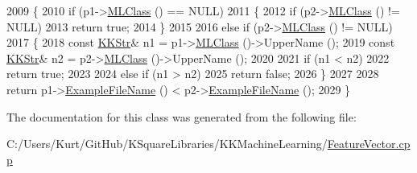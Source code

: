 \begin{DoxyCode}
2009   \{
2010     \textcolor{keywordflow}{if}  (p1->\hyperlink{class_k_k_m_l_l_1_1_feature_vector_a3c8fe002c6e868f8c00059c004fb32fd}{MLClass} () == NULL)
2011     \{
2012       \textcolor{keywordflow}{if}  (p2->\hyperlink{class_k_k_m_l_l_1_1_feature_vector_a3c8fe002c6e868f8c00059c004fb32fd}{MLClass} () != NULL)
2013         \textcolor{keywordflow}{return}  \textcolor{keyword}{true};
2014     \}
2015 
2016     \textcolor{keywordflow}{else} \textcolor{keywordflow}{if}  (p2->\hyperlink{class_k_k_m_l_l_1_1_feature_vector_a3c8fe002c6e868f8c00059c004fb32fd}{MLClass} () != NULL)
2017     \{
2018       \textcolor{keyword}{const} \hyperlink{class_k_k_b_1_1_k_k_str}{KKStr}& n1 = p1->\hyperlink{class_k_k_m_l_l_1_1_feature_vector_a3c8fe002c6e868f8c00059c004fb32fd}{MLClass} ()->UpperName ();
2019       \textcolor{keyword}{const} \hyperlink{class_k_k_b_1_1_k_k_str}{KKStr}& n2 = p2->\hyperlink{class_k_k_m_l_l_1_1_feature_vector_a3c8fe002c6e868f8c00059c004fb32fd}{MLClass} ()->UpperName ();
2020 
2021       \textcolor{keywordflow}{if}  (n1 < n2)
2022         \textcolor{keywordflow}{return} \textcolor{keyword}{true};
2023 
2024       \textcolor{keywordflow}{else} \textcolor{keywordflow}{if}  (n1 > n2)
2025         \textcolor{keywordflow}{return} \textcolor{keyword}{false};
2026     \}
2027 
2028     \textcolor{keywordflow}{return} p1->\hyperlink{class_k_k_m_l_l_1_1_feature_vector_ab47c89ab1e9396664fdc0dc34b6e1ab5}{ExampleFileName} () < p2->\hyperlink{class_k_k_m_l_l_1_1_feature_vector_ab47c89ab1e9396664fdc0dc34b6e1ab5}{ExampleFileName} ();
2029   \}
\end{DoxyCode}


The documentation for this class was generated from the following file\+:\begin{DoxyCompactItemize}
\item 
C\+:/\+Users/\+Kurt/\+Git\+Hub/\+K\+Square\+Libraries/\+K\+K\+Machine\+Learning/\hyperlink{_feature_vector_8cpp}{Feature\+Vector.\+cpp}\end{DoxyCompactItemize}

